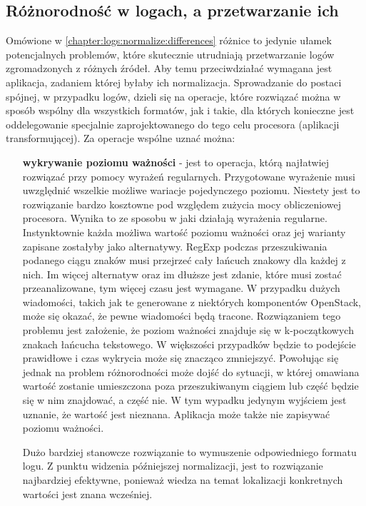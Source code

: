     \subsection{Różnorodność w logach, a przetwarzanie ich}
    Omówione w \ref{chapter:logs:normalize:differences} różnice to jedynie ułamek potencjalnych problemów, 
    które skutecznie utrudniają przetwarzanie logów zgromadzonych z różnych źródeł. Aby temu przeciwdziałać wymagana jest
    aplikacja, zadaniem której byłaby ich normalizacja. Sprowadzanie do postaci spójnej, w przypadku logów, dzieli się
    na operacje, które rozwiązać można w sposób wspólny dla wszystkich formatów, jak i takie, dla których konieczne jest
    oddelegowanie specjalnie zaprojektowanego do tego celu procesora (aplikacji transformującej). 
    Za operacje wspólne uznać można:
    \begin{itemize}
        \item[\textbf{wykrywanie poziomu ważności}] - jest to operacja, którą najłatwiej rozwiązać przy pomocy wyrażeń regularnych.
        Przygotowane wyrażenie musi uwzględnić wszelkie możliwe wariacje pojedynczego poziomu. Niestety jest to
        rozwiązanie bardzo kosztowne pod względem zużycia mocy obliczeniowej procesora. Wynika to ze sposobu w jaki działają 
        wyrażenia regularne. Instynktownie każda możliwa wartość poziomu ważności oraz jej warianty zapisane zostałyby 
        jako alternatywy. RegExp podczas przeszukiwania podanego ciągu znaków musi przejrzeć cały łańcuch znakowy dla każdej z nich.
        Im więcej alternatyw oraz im dłuższe jest zdanie, które musi zostać przeanalizowane, tym więcej czasu jest wymagane.
        W przypadku dużych wiadomości, takich jak te generowane z niektórych komponentów OpenStack, może się okazać, że 
        pewne wiadomości będą tracone. Rozwiązaniem tego problemu jest założenie, że poziom ważności znajduje się w k-początkowych
        znakach łańcucha tekstowego. W większości przypadków będzie to podejście prawidłowe i czas wykrycia może się znacząco zmniejszyć.
        Powołując się jednak na problem różnorodności może dojść do sytuacji, w której omawiana wartość zostanie umieszczona
        poza przeszukiwanym ciągiem lub część będzie się w nim znajdować, a część nie. W tym wypadku jedynym wyjściem jest uznanie, że
        wartość jest nieznana. Aplikacja może także nie zapisywać poziomu ważności.
        
        Dużo bardziej stanowcze rozwiązanie to wymuszenie odpowiedniego formatu logu. Z punktu
        widzenia późniejszej normalizacji, jest to rozwiązanie najbardziej efektywne, ponieważ wiedza
        na temat lokalizacji konkretnych wartości jest znana wcześniej.
        

\end{itemize}
